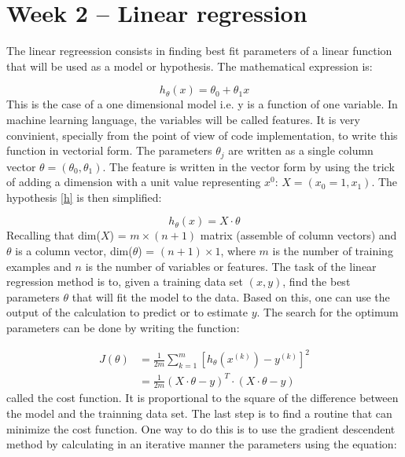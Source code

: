 \section{Week 2 -- Linear regression}

The linear regreession consists in finding best fit parameters of a linear function that will be used as a model 
or hypothesis. The mathematical expression is:

\begin{equation} \label{h}
    h_{\theta}(x) = \theta_{0} + \theta_{1} x
\end{equation}
This is the case of a one dimensional model i.e. y is a function of one variable. In machine learning language, the variables will be called features.
It is very convinient, specially from the point of view of code implementation, to write this function in vectorial form. 
The parameters $\theta_{j}$ are written as a single column vector $\theta = (\theta_{0}, \theta_{1})$. The feature is written in the vector form by using the trick
of adding a dimension with a unit value representing $x^{0}$: $X = (x_{0}=1, x_{1})$. The hypothesis \ref{h} is then simplified:

\begin{equation}
    h_{\theta}(x) = X \cdot \theta
\end{equation}
Recalling that dim($X$) =  $m \times (n+1)$ matrix (assemble of column vectors) and $\theta$ is a column vector, dim($\theta$) = $(n+1) \times 1$,
where $m$ is the number of training examples and $n$ is the number of variables or features.
The task of the linear regression method is to, given a training data set $(x,y)$, find the best parameters $\theta$ that will fit the model to the data.
Based on this, one can use the output of the calculation to predict or to estimate $y$. The search for the optimum parameters can be done by writing the function:

\begin{equation}
    \begin{split}
        J(\theta) &= \frac{1}{2 m} \sum _{k=1}^{m} [ h_{\theta}(x^{(k)}) - y^{(k)}]^{2} \\
                    & = \frac{1}{2 m} (X \cdot \theta - y)^{T} \cdot (X \cdot \theta - y)
    \end{split}
\end{equation}
called the cost function. It is proportional to the square of the difference between the model and the trainning data set. 
The last step is to find a routine that can minimize the cost function. One way to do this is to use the gradient descendent 
method by calculating in an iterative manner the parameters using the equation:

